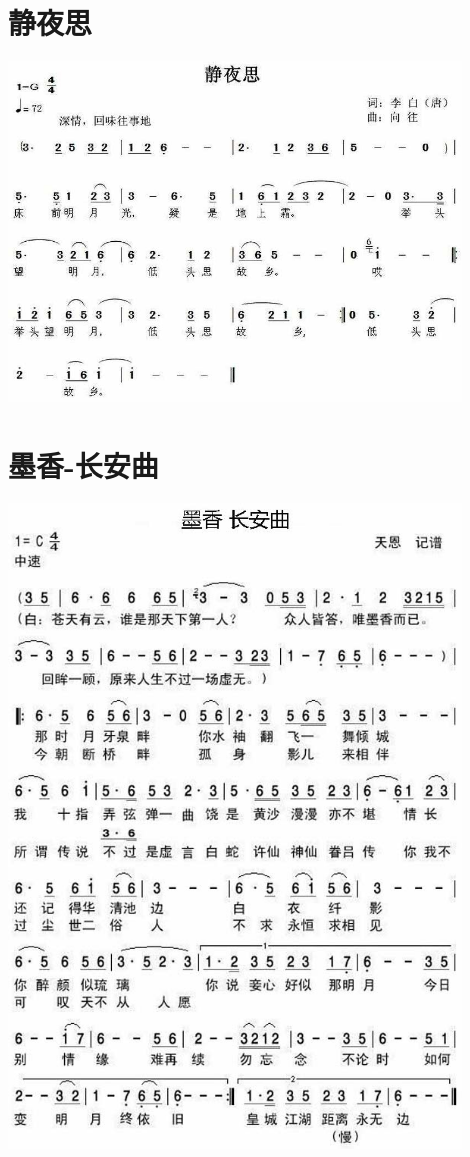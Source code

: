 \documentclass[cn,pad,chinesefont=nofont,twocol]{elegantbook}
\begin{document}
\section{静夜思}
    \includegraphics[width=0.9\textwidth]{dongxiao/20200411-静夜思}
\section{墨香-长安曲}
    \includegraphics[width=0.9\textwidth]{dongxiao/20200323墨香-长安曲.jpg}  
\end{document}
